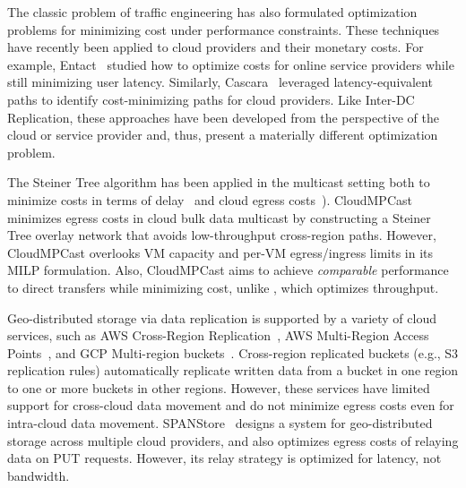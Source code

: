The classic problem of traffic engineering has also formulated optimization problems for minimizing cost under performance constraints.
These techniques have recently been applied to cloud providers and their monetary costs.
For example, Entact~\cite{zhang2010optimizing} studied how to optimize costs for online service providers while still minimizing user latency.  
Similarly, Cascara~\cite{singh2021cost} leveraged latency-equivalent paths to identify cost-minimizing paths for cloud providers.
Like Inter-DC Replication, these approaches have been developed from the perspective of the cloud or service provider and, thus, present a materially different optimization problem.


The Steiner Tree algorithm has been applied in the multicast setting both to minimize costs in terms of delay~\cite{jiang2016constructing} and cloud egress costs~\cite{garcia2015cost}).  CloudMPCast~\cite{garcia2015cost} minimizes egress costs in cloud bulk data multicast by constructing a Steiner Tree overlay network that avoids low-throughput cross-region paths.  However, CloudMPCast overlooks VM capacity and per-VM egress/ingress limits in its MILP formulation.  Also, CloudMPCast aims to achieve \textit{comparable} performance to direct transfers while minimizing cost, unlike \sys, which optimizes throughput. 


Geo-distributed storage via data replication is supported by a variety of cloud services, such as AWS Cross-Region Replication~\cite{aws-replication}, AWS Multi-Region Access Points~\cite{aws-access-point}, and GCP Multi-region buckets~\cite{gcp-multi-region-bucket}.  Cross-region replicated buckets (e.g., S3 replication rules) automatically replicate written data from a bucket in one region to one or more buckets in other regions.  However, these services have limited support for cross-cloud data movement and do not minimize egress costs even for intra-cloud data movement.  SPANStore~\cite{wu2013spanstore} designs a system for geo-distributed storage across multiple cloud providers, and also optimizes egress costs of relaying data on PUT requests.  However, its relay strategy is optimized for latency, not bandwidth.  

